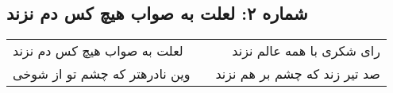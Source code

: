 \begin{center}
\section*{شماره ۲: لعلت به صواب هیچ کس دم نزند}
\label{sec:002}
\begin{longtable}{l p{0.5cm} r}
لعلت به صواب هیچ کس دم نزند
&&
رای شکری با همه عالم نزند
\\
وین نادرهتر که چشم تو از شوخی
&&
صد تیر زند که چشم بر هم نزند
\\
\end{longtable}
\end{center}
